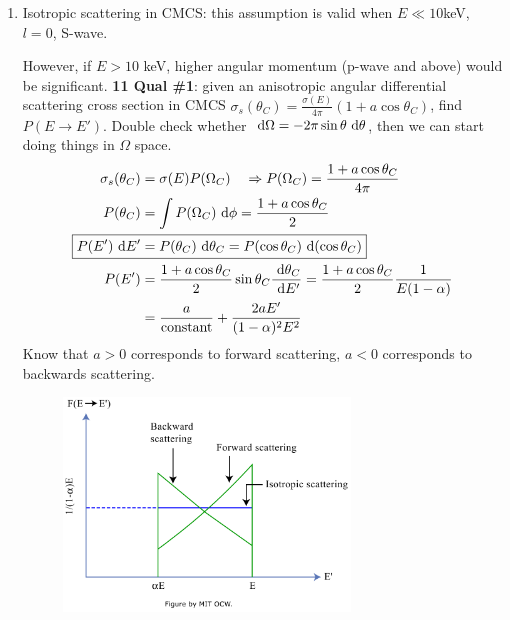 \documentclass{school-22.101-notes}
\begin{document}
\begin{enumerate}
\begin{enumerate}
\item Isotropic scattering in CMCS: this assumption is valid when $E \ll 10 $keV, $l=0$, S-wave. 

However, if $E > 10$ keV, higher angular momentum (p-wave and above) would be significant. 
\textbf{11 Qual \#1}: given an anisotropic angular differential scattering cross section in CMCS $\sigma_s (\theta_C) = \frac{\sigma (E)}{4 \pi} ( 1 + a \cos \theta_C)$, find $P(E \to E')$. Double check whether $\mbox{ }\mathrm{d} \Omega = - 2 \pi \sin \theta \mbox{ }\mathrm{d} \theta$, then we can start doing things in $\Omega$ space. 
\begin{align}
\sigma_s(\theta_C) &= \sigma(E) P(\Omega_C) \fsp \fsp \fsp \Rightarrow P(\Omega_C) = \frac{1 + a \cos \theta_C}{4 \pi} \\
 P(\theta_C) &= \int P(\Omega_C) \dphi =  \frac{1 + a \cos \theta_C}{2} \\
\Aboxed{ P(E') \dE' &= P(\theta_C) \dtheta_C  = P(\cos \theta_C) \derivative (\cos \theta_C)} \\
P(E^{\prime}) &= \frac{1 + a \cos \theta_C}{2} \sin \theta_C \frac{\dtheta_C}{\dE^{\prime}} = \frac{1 + a \cos \theta_C}{2}  \frac{1}{E(1-\alpha)} \\
&= \frac{a}{\mbox{constant}} + \frac{2 a E^{\prime}}{(1-\alpha)^2 E^2}
\end{align}
Know that $a>0$ corresponds to forward scattering, $a<0$ corresponds to backwards scattering. 

\begin{figure}
    \centering
    \includegraphics[width=3in]{images/ni/p-wave-approx.png}
\end{figure}
\end{enumerate}



\end{enumerate}
\end{document}
